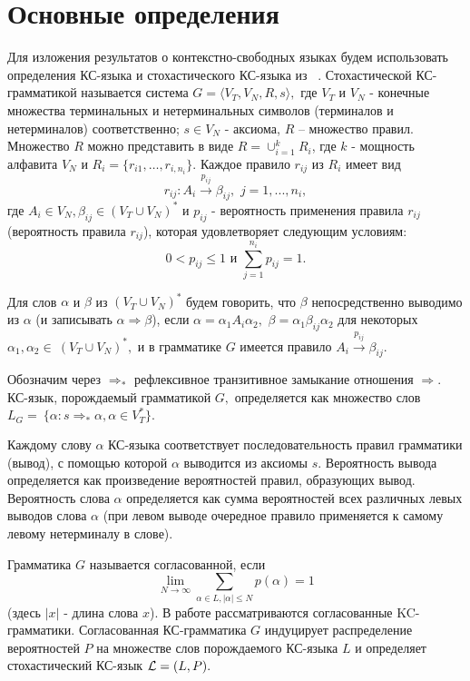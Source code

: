 \documentclass[10pt]{article}
\begin{document}
\section{Основные определения}
Для изложения результатов о контекстно-свободных языках будем
использовать определения КС-языка и стохастического КС-языка из ~\cite{zhilbib5,zhilbib6}. 
Стохастической КС-грамматикой называется система
$G=\langle V_T,V_N,R,s \rangle,$ где $V_T$ и $V_N$ - конечные множества
терминальных и нетерминальных символов
(терминалов и нетерминалов) соответственно;
$s \in V_N$ - аксиома, $R$ -- множество правил.
Множество $R$ можно представить в виде
$R=\cup_{i=1}^k R_i$, где $k$ - мощность алфавита
$V_N$ и $R_i=\{r_{i1},\ldots, r_{i,n_i} \}.$
Каждое правило $r_{ij}$ из $R_i$ имеет вид
$$
r_{ij}:A_i\stackrel{p_{ij}}{\rightarrow }\beta _{ij},\,\,j=1,...,n_i,
$$
где $A_i\in V_N,\beta _{ij}\in (V_T\cup V_N)^{*}$ и $p_{ij}$ - вероятность
применения правила $r_{ij}$ (вероятность правила $r_{ij}$), которая
удовлетворяет следующим условиям:
$$
0<p_{ij}\leq 1 \,  \,\mbox {и}\,\, \sum_{j=1}^{n_i} p_{ij}=1.
$$

Для слов $\alpha $ и $\beta$
из $(V_T\cup V_N)^{*}$ будем говорить, что $\beta$
непосредственно выводимо из $\alpha$ (и записывать $\alpha \Rightarrow \beta $), если
$\alpha=\alpha_1 A_i \alpha_2,$ $\beta =\alpha_1 \beta_{ij}\alpha_2$
для некоторых $\alpha_1,\alpha_2 \in ~(V_T\cup V_N)^{*},$
и в грамматике $G$ имеется правило $A_i\stackrel{p_{ij}}{\rightarrow }\beta
_{ij}.$

Обозначим через $\Rightarrow_{*}$ рефлексивное транзитивное замыкание
отношения $\Rightarrow$.
КС-язык, порождаемый грамматикой $G,$ определяется как множество слов $L_G=~\{
\alpha : s \Rightarrow_{*} \alpha, \alpha \in V_T^* \}.$

Каждому слову $\alpha$ КС-языка соответствует последовательность правил
грамматики (вывод), с помощью которой $\alpha$ выводится из аксиомы $s.$
Вероятность вывода определяется как произведение вероятностей правил,
образующих вывод. Вероятность слова $\alpha$ определяется как
сумма вероятностей всех различных левых выводов слова $\alpha$
(при левом выводе очередное правило применяется к самому левому нетерминалу
в слове).

Грамматика $G$ называется согласованной, если
$$
\lim _{N\rightarrow \infty }\sum_{\alpha \in L, |\alpha |\le N}
p(\alpha)=1
$$
(здесь $|x|$ - длина слова $x$).
В работе рассматриваются согласованные KC-грамматики.
Согласованная КС-грам\-ма\-ти\-ка $G$ индуцирует распределение вероятностей
$P$ на множестве слов порождаемого КС-языка $L$ и определяет
стохастический КС-язык ${\cal L}=(L,P).$
\end{document}
